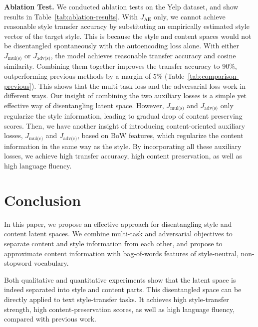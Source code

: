 \documentclass[11pt,a4paper]{article}
\newcommand{\loss}[1]{J_{\text{#1}}}
\begin{document}
\textbf{Ablation Test.} We conducted ablation tests on the Yelp dataset, and show results in Table~\ref{tab:ablation-results}. With $\loss{AE}$ only, we cannot achieve reasonable style transfer accuracy by substituting an empirically estimated style vector of the target style.  This is because the style and content spaces would not be disentangled spontaneously with the autoencoding loss alone.
With either $\loss{mul(s)}$ or $\loss{adv(s)}$, the model achieves reasonable transfer accuracy and cosine similarity. Combining them together improves the transfer accuracy to 90\%, outperforming previous methods by a margin of $5\%$ (Table~\ref{tab:comparison-previous}). This shows that the multi-task loss and the adversarial loss work in different ways. Our insight of combining the two auxiliary losses is a simple yet effective way of disentangling latent space.
However, $\loss{mul(s)}$ and $\loss{adv(s)}$ only regularize the style information, leading to gradual drop of content preserving scores. Then, we have another insight of introducing content-oriented auxiliary losses, $\loss{mul(c)}$ and $\loss{adv(c)}$, based on BoW features, which regularize the content information in the same way as the style. By incorporating all these auxiliary losses, we achieve high transfer accuracy, high content preservation, as well as high language fluency.

\section{Conclusion}
In this paper, we propose an effective approach for disentangling style and content latent spaces.
We combine multi-task and adversarial objectives to separate content and style information from each other, and propose to approximate content information with bag-of-words features of style-neutral, non-stopword vocabulary.

Both qualitative and quantitative experiments show that the latent space is indeed separated into style and content parts.
This disentangled space can be directly applied to text style-transfer tasks.
It achieves high style-transfer strength, high content-preservation scores, as well as high language fluency, compared with previous work.



\end{document}

